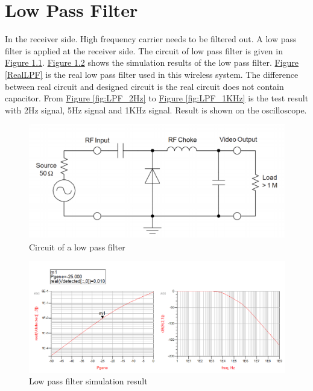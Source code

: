 \documentclass[12pt,a4paper]{report}
\begin{document}
\chapter{Low Pass Filter}
In the receiver side. High frequency carrier needs to be filtered out. A low pass filter is applied at the receiver side. The circuit of low pass filter is given in \hyperref[fig:typical_detector_circuit]{Figure \ref*{fig:typical_detector_circuit}}.
\hyperref[LPFSimulationResult]{Figure \ref*{LPFSimulationResult}} shows the simulation results of the low pass filter. \hyperref[RealLPF]{Figure \ref*{RealLPF}} is the real low pass filter used in this wireless system. The difference between real
circuit and designed circuit is the real circuit does not contain capacitor. From \hyperref[fig:LPF_2Hz]{Figure \ref*{fig:LPF_2Hz}} to \hyperref[fig:LPF_1KHz]{Figure \ref*{fig:LPF_1KHz}} is the test result with 2Hz signal, 5Hz signal and 1KHz signal. Result is shown
on the oscilloscope.
\begin{figure}[ht]
    \centerline{\includegraphics[scale=1]{typical_detector_circuit}}
    \caption{Circuit of a low pass filter}
    \label{fig:typical_detector_circuit}
\end{figure}

\begin{figure}[H]
    \centerline{\includegraphics[scale=0.5]{LPF_SimulationResult.PNG}}
    \caption{Low pass filter simulation result}
    \label{LPFSimulationResult}
\end{figure}
\end{document}
